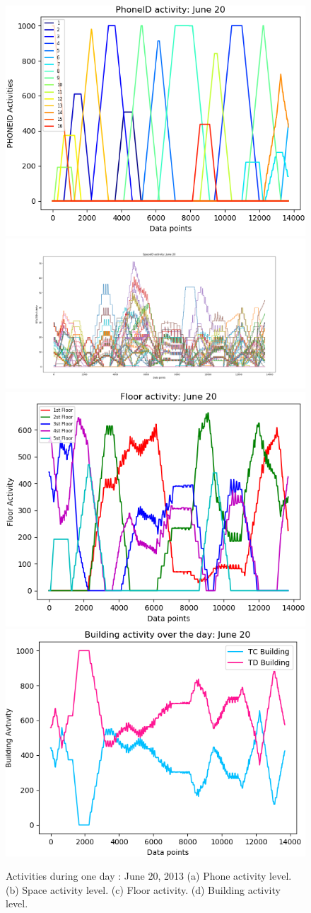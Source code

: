 \begin{figure}
    \centering
        \includegraphics[width = 7 cm]{image/Chapters/Chapter6/phoneTimejune20png.png}\hfill
        \includegraphics[width = 8 cm]{image/Chapters/Chapter6/spaceidAccumulatjune20.png}\hfill
        \includegraphics[width = 7 cm]{image/Chapters/Chapter6/floorTimejune20.png}\hfill
        \includegraphics[width = 7 cm]{image/Chapters/Chapter6/buildingTimejun6.png}
    \caption{Activities during one day : June 20, 2013 (a) Phone activity level. (b) Space activity level. (c) Floor activity. (d) Building activity level.}
    \label{static}
\end{figure}





